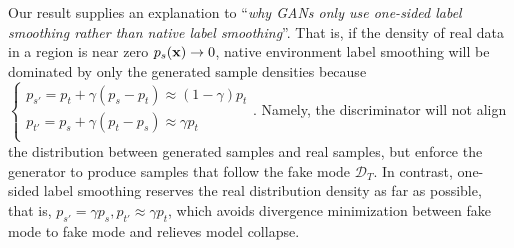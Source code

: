 \documentclass{article} \usepackage{iclr2023_conference,times}
\newcommand{\D}{\mathcal{D}}
\begin{document}
Our result supplies an explanation to ``\textit{why GANs only use one-sided label smoothing rather than native label smoothing}''. That is, if the density of real data in a region is near zero $p_s(\mathbf{x})\rightarrow 0$, native environment label smoothing will be dominated by only the generated sample densities because $\left\{         \begin{array}{l} 
    p_{s'}=p_t+\gamma(p_s-p_t)\approx (1-\gamma) p_t\\ 
    p_{t'}=p_s+\gamma(p_t-p_s)\approx \gamma p_t\\ 
  \end{array}\right.$.
Namely, the discriminator will not align the distribution between generated samples and real samples, but enforce the generator to produce samples that follow the fake mode $\D_T$. In contrast, one-sided label smoothing reserves the real distribution density as far as possible, that is, $p_{s'}=\gamma p_s, p_{t'}\approx \gamma p_t$, which avoids divergence minimization between fake mode to fake mode and relieves model collapse. 
\end{document}
